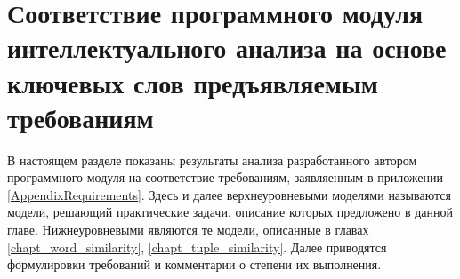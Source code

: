 

\section{Соответствие программного модуля интеллектуального анализа на основе ключевых слов предъявляемым требованиям}
В настоящем разделе показаны результаты анализа разработанного автором программного модуля на соответствие требованиям, заявляенным в приложении \ref{AppendixRequirements}. Здесь и далее верхнеуровневыми моделями называются модели, решающий практические задачи, описание которых предложено в данной главе. Нижнеуровневыми являются те модели, описанные в главах \ref{chapt_word_similarity}, \ref{chapt_tuple_similarity}. Далее приводятся формулировки требований и комментарии о степени их выполнения.

